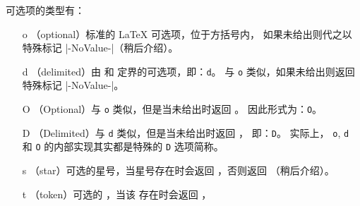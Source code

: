 \documentclass{l3doc}
\begin{document}
可选项的类型有：
 \begin{itemize}[font=\ttfamily]
\item[o] （optional）标准的 \LaTeX{} 可选项，位于方括号内，
如果未给出则代之以特殊标记 |-NoValue-|（稍后介绍）。
\item[d] （delimited）由  和  定界的可选项，即：\texttt{d}。
与 \texttt{o} 类似，如果未给出则返回特殊标记 |-NoValue-|。
\item[O] （Optional）与 \texttt{o} 类似，但是当未给出时返回 。
因此形式为：\texttt{O}。
\item[D] （Delimited）与 \texttt{d} 类似，但是当未给出时返回 ，
即：\texttt{D}。
实际上， \texttt{o}, \texttt{d} 和 \texttt{O} 的内部实现其实都是特殊的 \texttt{D} 选项简称。
\item[s] （star）可选的星号，当星号存在时会返回 ，否则返回 （稍后介绍）。
\item[t] （token）可选的 ，当该  存在时会返回 ，

\end{itemize}
\end{document}
